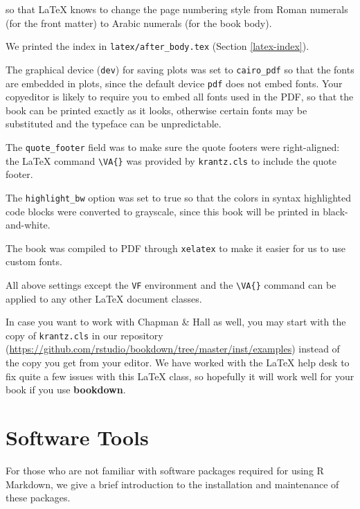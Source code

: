 \documentclass[
  12pt,
]{krantz}
\theoremstyle{definition}
\theoremstyle{definition}
\theoremstyle{definition}
\theoremstyle{definition}
\theoremstyle{remark}
\begin{document}
so that LaTeX knows to change the page numbering style from Roman numerals (for the front matter) to Arabic numerals (for the book body).

We printed the index in \texttt{latex/after\_body.tex} (Section \ref{latex-index}).

The graphical device (\texttt{dev}) for saving plots was set to \texttt{cairo\_pdf} so that the fonts are embedded in plots, since the default device \texttt{pdf} does not embed fonts. Your copyeditor is likely to require you to embed all fonts used in the PDF, so that the book can be printed exactly as it looks, otherwise certain fonts may be substituted and the typeface can be unpredictable.

The \texttt{quote\_footer} field was to make sure the quote footers were right-aligned: the LaTeX command \texttt{\textbackslash{}VA\{\}} was provided by \texttt{krantz.cls} to include the quote footer.

The \texttt{highlight\_bw} option was set to true so that the colors in syntax highlighted code blocks were converted to grayscale, since this book will be printed in black-and-white.

The book was compiled to PDF through \texttt{xelatex} to make it easier for us to use custom fonts.

All above settings except the \texttt{VF} environment and the \texttt{\textbackslash{}VA\{\}} command can be applied to any other LaTeX document classes.

In case you want to work with Chapman \& Hall as well, you may start with the copy of \texttt{krantz.cls} in our repository (\url{https://github.com/rstudio/bookdown/tree/master/inst/examples}) instead of the copy you get from your editor. We have worked with the LaTeX help desk to fix quite a few issues with this LaTeX class, so hopefully it will work well for your book if you use \textbf{bookdown}.

\cleardoublepage

\appendix {}


\chapter{Software Tools}\label{software-tools}

For those who are not familiar with software packages required for using R Markdown, we give a brief introduction to the installation and maintenance of these packages.
\end{document}
